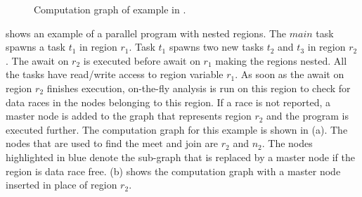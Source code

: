 \begin{figure}
  \caption{Computation graph of example in .}
   \label{fig:cg-nested-regions}
\end{figure}

 shows an example of a parallel program with nested regions. The $main$ task spawns a task $t_1$ in region $r_1$. Task $t_1$ spawns two new tasks $t_2$ and $t_3$ in region $r_2$. The await on $r_2$ is executed before await on $r_1$ making the regions nested. All the tasks have read/write access to region variable $r_1$. As soon as the await on region $r_2$ finishes execution, on-the-fly analysis is run on this region to check for data races in the nodes belonging to this region. If a race is not reported, a master node is added to the graph that represents region $r_2$ and the program is executed further. The computation graph for this example is shown in (a). The nodes that are used to find the $\mathrm{meet}$ and $\mathrm{join}$ are $r_2$ and $n_2$. The nodes highlighted in blue denote the sub-graph that is replaced by a master node if the region is data race free. (b) shows the computation graph with a master node inserted in place of region $r_2$.
